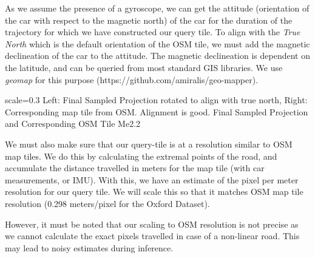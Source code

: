 As we assume the presence of a gyroscope, we can get the attitude (orientation of the car with respect to the magnetic north) of the car for the duration of the trajectory for which we have constructed our query tile. To align with the \textit{True North} which is the default orientation of the OSM tile, we must add the magnetic declineation of the car to the attitude. The magnetic declineation is dependent on the latitude, and can be queried from most standard GIS libraries. We use \textit{geomap} for this purpose (https://github.com/amiralis/geo-mapper).

{scale=0.3}%
{Left: Final Sampled Projection rotated to align with true north, Right: Corresponding map tile from OSM. Alignment is good.}%
{Final Sampled Projection and Corresponding OSM Tile}%
{Me2.2}

We must also make sure that our query-tile is at a resolution similar to OSM map tiles. We do this by calculating the extremal points of the road, and accumulate the distance travelled in meters for the map tile (with car measurements, or IMU). With this, we have an estimate of the pixel per meter resolution for our query tile. We will scale this so that it matches OSM map tile resolution (0.298 meters/pixel for the Oxford Dataset).

However, it must be noted that our scaling to OSM resolution is not precise as we cannot calculate the exact pixels travelled in case of a non-linear road. This may lead to noisy estimates during inference. 













































































